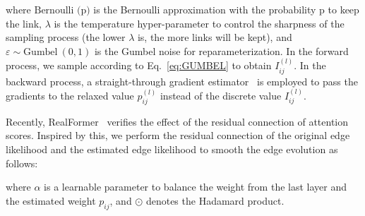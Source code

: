 



\noindent where $\text{Bernoulli (p)}$ is the Bernoulli approximation with the probability $\text{p}$ to keep the link, $\lambda$ is the temperature hyper-parameter to control the sharpness of the sampling process (the lower $\lambda$ is, the more links will be kept), 
and $\varepsilon \sim \text{Gumbel}~(0,1)$ is the Gumbel noise for reparameterization.
In the forward process, we sample according to Eq.~\eqref{eq:GUMBEL} to obtain $I^{(l)}_{ij}$. 
In the backward process, a straight-through gradient estimator~\cite{bengio2013estimating} is employed to pass the gradients to the relaxed value $p_{ij}^{(l)}$ instead of the discrete value ${I}^{(l)}_{ij}$. %


 Recently, RealFormer~\cite{he2020realformer} verifies the effect of the residual connection of attention scores. Inspired by this, we perform the residual connection of the original edge likelihood and the estimated edge likelihood to smooth the edge evolution as follows:


\noindent where $\alpha$ is a learnable parameter to balance the weight from the last layer and the estimated weight $p_{ij}$, and $\odot$ denotes the Hadamard product. 




